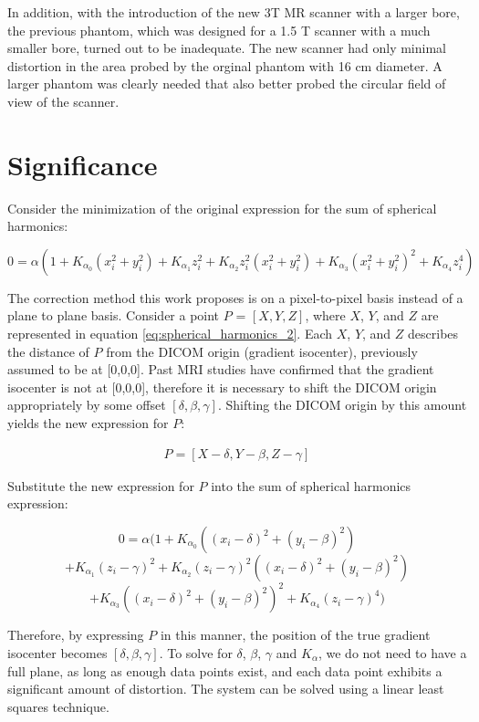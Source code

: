 In addition, with the introduction of the new 3T MR scanner with a larger bore, the previous phantom, which was designed for a 1.5 T scanner with a much smaller bore, turned out to be inadequate. The new scanner had only minimal distortion in the area probed by the orginal phantom with 16 cm diameter. A larger phantom was clearly needed that also better probed the circular field of view of the scanner.

\section{Significance}


Consider the minimization of the original expression for the sum of spherical harmonics:

\begin{equation} \label{eq:spherical_harmonics_2}
0 = \alpha(1 + K_{\alpha_0}(x^2_i + y^2_i) + K_{\alpha_1}z^2_i +
K_{\alpha_2}z^2_i(x^2_i + y^2_i) + K_{\alpha_3}(x^2_i + y^2_i)^2 +
K_{\alpha_4}z^4_i)
\end{equation}

The correction method this work proposes is on a pixel-to-pixel basis instead of a plane to plane basis.
Consider a point $P$ = $[X,Y,Z]$, where $X$, $Y$, and $Z$ are represented in equation \ref{eq:spherical_harmonics_2}. Each $X$, $Y$, and $Z$ describes the distance of $P$ from the DICOM origin (gradient isocenter), previously assumed to be at [0,0,0].  Past MRI studies have confirmed that the gradient isocenter is not at [0,0,0], therefore it is necessary to shift the DICOM origin appropriately by some offset $[\delta,\beta,\gamma]$.  Shifting the DICOM origin by this amount yields the new expression for $P$:

\begin{eqnarray}
P = [X - \delta, Y - \beta, Z - \gamma]
\end{eqnarray}

Substitute the new expression for $P$ into the sum of spherical harmonics expression:

$$0 = \alpha(1 + K_{\alpha_0}((x_i - \delta)^2 + (y_i - \beta)^2)$$
$$+ K_{\alpha_1}(z_i - \gamma)^2 + K_{\alpha_2}(z_i - \gamma)^2((x_i - \delta)^2 + (y_i - \beta)^2)$$
$$+ K_{\alpha_3}((x_i - \delta)^2 + (y_i - \beta)^2)^2 + K_{\alpha_4}(z_i - \gamma)^4)$$

Therefore, by expressing $P$ in this manner, the position of the true gradient isocenter becomes
$[\delta, \beta, \gamma]$. To solve for $\delta$, $\beta$, $\gamma$ and $K_{\alpha}$, we do not need
to have a full plane, as long as enough data points exist, and each data point exhibits a significant amount of distortion. The system can be solved using a linear least squares technique.

